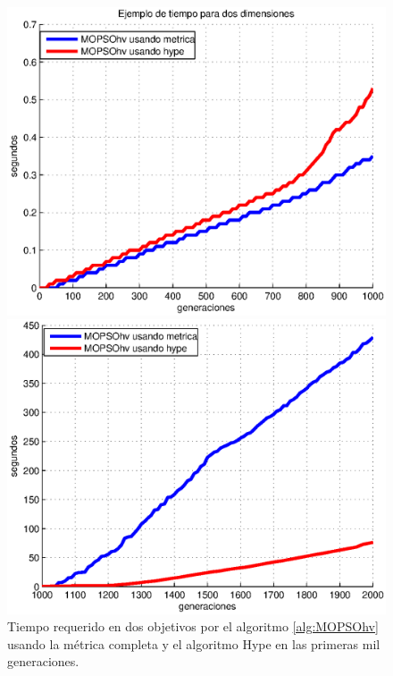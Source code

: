 \begin{enumerate}
\begin{itemize}
      
      \begin{figure}
\centering
  \begin{minipage}{0.45\textwidth}
    \centering
    \includegraphics[scale=0.5]{Cap3/time1.eps}
    \caption[Tiempo entre MOPSOhv en dos dimensiones (a)]{Tiempo requerido en dos objetivos por el algoritmo \ref{alg:MOPSOhv} usando la 
    m\'etrica completa y el algoritmo Hype en las primeras mil generaciones.}
    \label{fig:time1}
  \end{minipage}%
  \hspace{5mm}
  \begin{minipage}{0.4\textwidth}
    \centering
    \includegraphics[scale=0.5]{Cap3/time2.eps}

\end{minipage}
\end{figure}
\end{itemize}
\end{enumerate}
